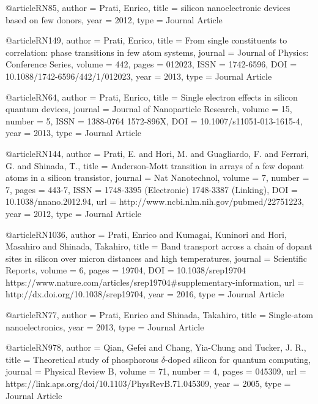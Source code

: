 @article{RN85,
   author = {Prati, Enrico},
   title = {silicon nanoelectronic devices based on few donors},
   year = {2012},
   type = {Journal Article}
}

@article{RN149,
   author = {Prati, Enrico},
   title = {From single constituents to correlation: phase transitions in few atom systems},
   journal = {Journal of Physics: Conference Series},
   volume = {442},
   pages = {012023},
   ISSN = {1742-6596},
   DOI = {10.1088/1742-6596/442/1/012023},
   year = {2013},
   type = {Journal Article}
}

@article{RN64,
   author = {Prati, Enrico},
   title = {Single electron effects in silicon quantum devices},
   journal = {Journal of Nanoparticle Research},
   volume = {15},
   number = {5},
   ISSN = {1388-0764
1572-896X},
   DOI = {10.1007/s11051-013-1615-4},
   year = {2013},
   type = {Journal Article}
}

@article{RN144,
   author = {Prati, E. and Hori, M. and Guagliardo, F. and Ferrari, G. and Shinada, T.},
   title = {Anderson-Mott transition in arrays of a few dopant atoms in a silicon transistor},
   journal = {Nat Nanotechnol},
   volume = {7},
   number = {7},
   pages = {443-7},
   ISSN = {1748-3395 (Electronic)
1748-3387 (Linking)},
   DOI = {10.1038/nnano.2012.94},
   url = {http://www.ncbi.nlm.nih.gov/pubmed/22751223},
   year = {2012},
   type = {Journal Article}
}

@article{RN1036,
   author = {Prati, Enrico and Kumagai, Kuninori and Hori, Masahiro and Shinada, Takahiro},
   title = {Band transport across a chain of dopant sites in silicon over micron distances and high temperatures},
   journal = {Scientific Reports},
   volume = {6},
   pages = {19704},
   DOI = {10.1038/srep19704
https://www.nature.com/articles/srep19704#supplementary-information},
   url = {http://dx.doi.org/10.1038/srep19704},
   year = {2016},
   type = {Journal Article}
}

@article{RN77,
   author = {Prati, Enrico and Shinada, Takahiro},
   title = {Single-atom nanoelectronics},
   year = {2013},
   type = {Journal Article}
}

@article{RN978,
   author = {Qian, Gefei and Chang, Yia-Chung and Tucker, J. R.},
   title = {Theoretical study of phosphorous $\ensuremath{\delta}$-doped silicon for quantum computing},
   journal = {Physical Review B},
   volume = {71},
   number = {4},
   pages = {045309},
   url = {https://link.aps.org/doi/10.1103/PhysRevB.71.045309},
   year = {2005},
   type = {Journal Article}
}

